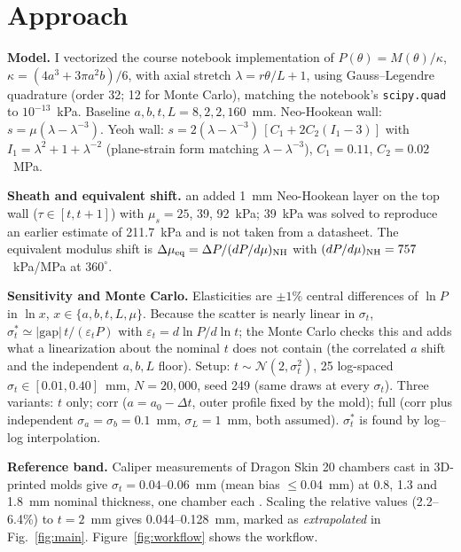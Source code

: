 \documentclass[12pt,letterpaper]{article}
\begin{document}
\section{Approach}
\textbf{Model.} I vectorized the course notebook implementation of $P(\theta)=M(\theta)/\kappa$, $\kappa=(4a^3+3\pi a^2 b)/6$, with axial stretch $\lambda=r\theta/L+1$, using Gauss--Legendre quadrature (order 32; 12 for Monte Carlo), matching the notebook's \texttt{scipy.quad} to $10^{-13}$~kPa. Baseline $a,b,t,L=8,2,2,160$~mm. Neo-Hookean wall: $s=\mu(\lambda-\lambda^{-3})$. Yeoh wall: $s=2(\lambda-\lambda^{-3})\,[C_1+2C_2(I_1-3)]$ with $I_1=\lambda^2+1+\lambda^{-2}$ (plane-strain form matching $\lambda-\lambda^{-3}$), $C_1{=}0.11$, $C_2{=}0.02$~MPa.\par\textbf{Sheath and equivalent shift.} an added 1~mm Neo-Hookean layer on the top wall ($\tau\in[t,t{+}1]$) with $\mu_s=25$, 39, 92~kPa; 39~kPa was solved to reproduce an earlier estimate of 211.7~kPa and is not taken from a datasheet. The equivalent modulus shift is $\Delta\mu_{\rm eq}=\Delta P/(dP/d\mu)_{\rm NH}$ with $(dP/d\mu)_{\rm NH}=757$~kPa/MPa at $360^\circ$.\par\textbf{Sensitivity and Monte Carlo.} Elasticities are $\pm1\%$ central differences of $\ln P$ in $\ln x$, $x\in\{a,b,t,L,\mu\}$. Because the scatter is nearly linear in $\sigma_t$, $\sigma_t^*\simeq|\text{gap}|\,t/(\varepsilon_t P)$ with $\varepsilon_t=d\ln P/d\ln t$; the Monte Carlo checks this and adds what a linearization about the nominal $t$ does not contain (the correlated $a$ shift and the independent $a,b,L$ floor). Setup: $t\sim\mathcal N(2,\sigma_t^2)$, 25 log-spaced $\sigma_t\in[0.01,0.40]$~mm, $N{=}20{,}000$, seed 249 (same draws at every $\sigma_t$). Three variants: $t$ only; corr ($a=a_0-\Delta t$, outer profile fixed by the mold); full (corr plus independent $\sigma_a=\sigma_b=0.1$~mm, $\sigma_L=1$~mm, both assumed). $\sigma_t^*$ is found by log--log interpolation.\par\textbf{Reference band.} Caliper measurements of Dragon Skin 20 chambers cast in 3D-printed molds give $\sigma_t=0.04$--0.06~mm (mean bias $\le0.04$~mm) at 0.8, 1.3 and 1.8~mm nominal thickness, one chamber each \cite{mccall2024soft}. Scaling the relative values (2.2--6.4\%) to $t{=}2$~mm gives 0.044--0.128~mm, marked as \emph{extrapolated} in Fig.~\ref{fig:main}. Figure~\ref{fig:workflow} shows the workflow.


\end{document}
